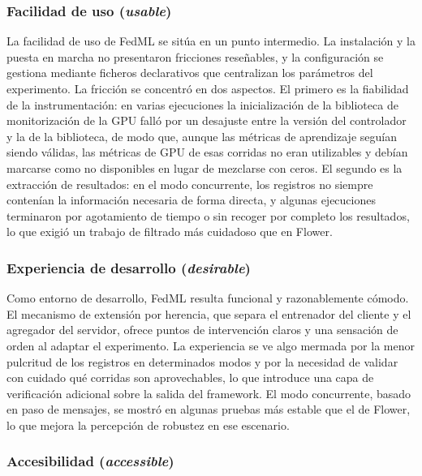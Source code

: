 \subsubsection{Facilidad de uso (\textit{usable})}\label{sec:usab-fedml-usable}

La facilidad de uso de FedML se sitúa en un punto intermedio. La instalación y la puesta en
marcha no presentaron fricciones reseñables, y la configuración se gestiona mediante ficheros
declarativos que centralizan los parámetros del experimento. La fricción se concentró en dos
aspectos. El primero es la fiabilidad de la instrumentación: en varias ejecuciones la
inicialización de la biblioteca de monitorización de la GPU falló por un desajuste entre la
versión del controlador y la de la biblioteca, de modo que, aunque las métricas de
aprendizaje seguían siendo válidas, las métricas de GPU de esas corridas no eran utilizables
y debían marcarse como no disponibles en lugar de mezclarse con ceros. El segundo es la
extracción de resultados: en el modo concurrente, los registros no siempre contenían la
información necesaria de forma directa, y algunas ejecuciones terminaron por agotamiento de
tiempo o sin recoger por completo los resultados, lo que exigió un trabajo de filtrado más
cuidadoso que en Flower.

\subsubsection{Experiencia de desarrollo (\textit{desirable})}\label{sec:usab-fedml-desirable}

Como entorno de desarrollo, FedML resulta funcional y razonablemente cómodo. El mecanismo de
extensión por herencia, que separa el entrenador del cliente y el agregador del servidor,
ofrece puntos de intervención claros y una sensación de orden al adaptar el experimento. La
experiencia se ve algo mermada por la menor pulcritud de los registros en determinados modos
y por la necesidad de validar con cuidado qué corridas son aprovechables, lo que introduce una
capa de verificación adicional sobre la salida del framework. El modo concurrente, basado en
paso de mensajes, se mostró en algunas pruebas más estable que el de Flower, lo que mejora la
percepción de robustez en ese escenario.

\subsubsection{Accesibilidad (\textit{accessible})}\label{sec:usab-fedml-accessible}


